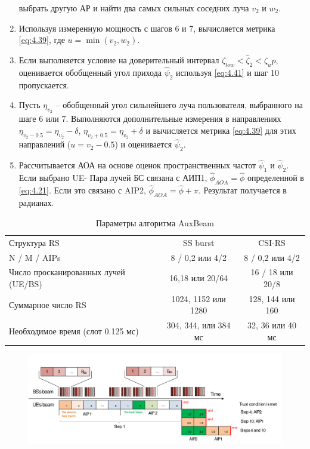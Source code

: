 \begin{enumerate}[label=\textbf{Шаг \arabic*:}]
          выбрать другую АР и найти два самых сильных соседних луча $v_2$ и $w_2$.
    \item Используя измеренную мощность с шагов 6 и 7, вычисляется метрика \eqref{eq:4.39},
          где $u=\min(v_2,w_2)$.
    \item Если выполняется условие на доверительный интервал $\zeta_{low} < \hat \zeta_2 < \zeta_up$,
          оценивается обобщенный угол прихода $\hat \psi_2$ используя \eqref{eq:4.41} и шаг 10 пропускается.
    \item Пусть $\eta_{v_2}$ -- обобщенный угол сильнейшего луча пользователя, выбранного на шаге 6 или 7.
          Выполняются дополнительные измерения в направлениях
          $\eta_{v_2 - 0.5} = \eta_{v_2} - \delta$,
          $\eta_{v_2 + 0.5} = \eta_{v_2} + \delta$ и вычисляется метрика \eqref{eq:4.39}
          для этих направлений ($u=v_2 - 0.5$) и оценивается $\hat \psi_2$.
    \item Рассчитывается АОА на основе оценок пространственных частот $\hat \psi_1$ и
          $\hat \psi_2$. Если выбрано UE- Пара лучей БС связана с АИП1, $\hat \phi_{AOA}=\hat \phi$
          определенной в \eqref{eq:4.21}.
          Если это связано с AIP2, $\hat \phi_{AOA} = \hat\phi + \pi$. Результат
          получается в радианах.
\end{enumerate}

\begin{table}
    \centering
    \caption{Параметры алгоритма AuxBeam}
    \begin{tabular}{lcc}
        \toprule
        \midrule
        Структура RS                         & SS burst             & CSI-RS            \\
        N / M / AIPs                         & 8 / 0,2  или 4/2     & 8 / 0,2 или 4/2   \\
        Число просканированных лучей (UE/BS) & 16,18 или 20/64      & 16 / 18  или 20/8 \\
        Суммарное число RS                   & 1024, 1152 или 1280  & 128, 144 или 160  \\
        Необходимое время (слот 0.125 мс)    & 304, 344, или 384 мс & 32, 36 или 40 мс  \\
        \hline
    \end{tabular}
\end{table}
\begin{figure}[h!]
    \centering
    \includegraphics[width=\linewidth]{figs/fig4.26}
    \caption{}
    \label{fig:4.26}
\end{figure}

